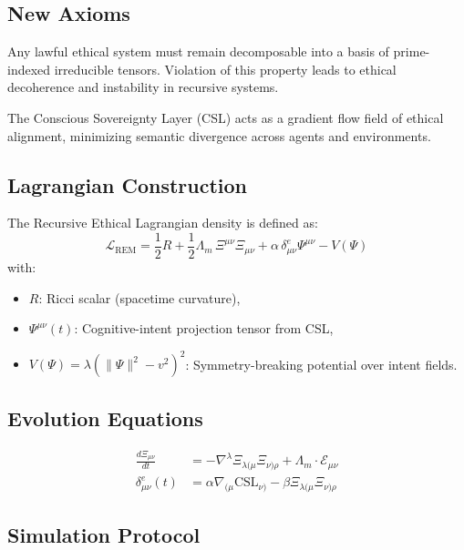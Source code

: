\documentclass{article}
\theoremstyle{plain}
\begin{document}
\subsection{New Axioms}

\begin{axiom}
Any lawful ethical system must remain decomposable into a basis of prime-indexed irreducible tensors. Violation of this property leads to ethical decoherence and instability in recursive systems.
\end{axiom}

\begin{axiom}
The Conscious Sovereignty Layer (CSL) acts as a gradient flow field of ethical alignment, minimizing semantic divergence across agents and environments.
\end{axiom}

\subsection{Lagrangian Construction}

The Recursive Ethical Lagrangian density is defined as:
\[
\mathcal{L}_{\text{REM}} = \frac{1}{2} R + \frac{1}{2} \Lambda_m \, \Xi^{\mu\nu} \Xi_{\mu\nu} + \alpha \, \delta^e_{\mu\nu} \Psi^{\mu\nu} - V(\Psi)
\]
with:
\begin{itemize}
  \item $R$: Ricci scalar (spacetime curvature),
  \item $\Psi^{\mu\nu}(t)$: Cognitive-intent projection tensor from CSL,
  \item $V(\Psi) = \lambda(\|\Psi\|^2 - v^2)^2$: Symmetry-breaking potential over intent fields.
\end{itemize}

\subsection{Evolution Equations}

\begin{align*}
\frac{d \Xi_{\mu\nu}}{dt} &= - \nabla^\lambda \Xi_{\lambda(\mu} \Xi_{\nu)\rho} + \Lambda_m \cdot \mathcal{E}_{\mu\nu} \\
\delta^e_{\mu\nu}(t) &= \alpha \nabla_{(\mu} \text{CSL}_{\nu)} - \beta \Xi_{\lambda(\mu} \Xi_{\nu)\rho}
\end{align*}

\subsection{Simulation Protocol}
\end{document}
